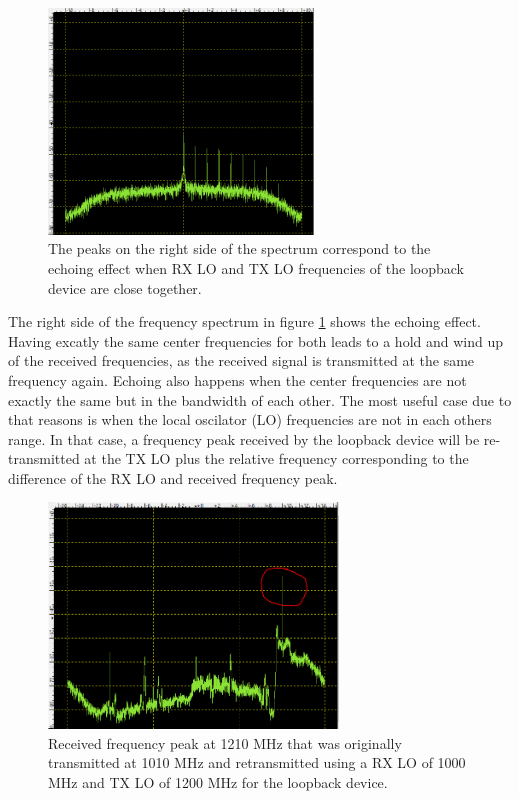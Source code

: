 \documentclass[journal]{IEEEtran}
\begin{document}
\newpage

\begin{figure}[h]
   \includegraphics[width=1\linewidth, height=6cm]{fig/echoing.PNG}
   \caption{ The peaks on the right side of the spectrum correspond to the echoing effect when RX LO and TX LO frequencies of the loopback device are close together. }
   \label{fig:echo}
\end{figure}

The right side of the frequency spectrum in figure \ref{fig:echo} shows the echoing effect. 
Having excatly the same center frequencies for both leads to a hold and wind up of the received frequencies, as the received signal is transmitted at the same frequency again.
Echoing also happens when the center frequencies are not exactly the same but in the bandwidth of each other.
The most useful case due to that reasons is when the local oscilator (LO) frequencies are not in each others range.
In that case, a frequency peak received by the loopback device will be re-transmitted at the TX LO plus the relative frequency corresponding to the difference of the RX LO and received frequency peak.

\begin{figure}[h]
   \includegraphics[width=1\linewidth, height=6cm]{fig/example_loopback.PNG}
   \caption{ Received frequency peak at 1210 MHz that was originally transmitted at 1010 MHz and retransmitted using a RX LO of 1000 MHz and TX LO of 1200 MHz for the loopback device. }
   \label{fig:exloop}
\end{figure}
\end{document}
